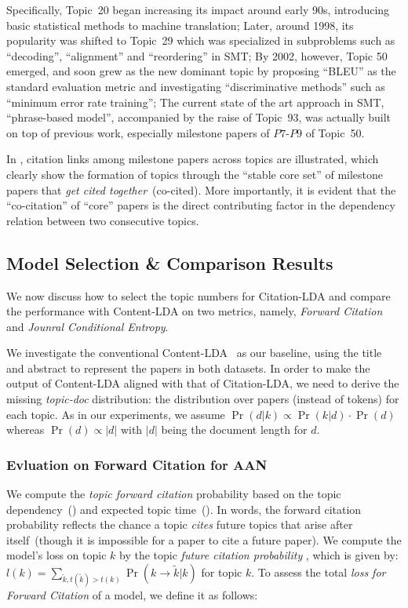 Specifically, Topic~20 began increasing its impact around early 90s, introducing
basic statistical methods to machine translation; Later, around 1998, its
popularity was shifted to Topic~29 which was specialized in subproblems such as
``decoding'', ``alignment'' and ``reordering'' in SMT; By 2002, however, Topic
50 emerged, and soon grew as the new dominant topic by proposing ``BLEU'' as the
standard evaluation metric and investigating ``discriminative methods'' such as
``minimum error rate training''; The current state of the art approach in SMT,
``phrase-based model'', accompanied by the raise of Topic~93, was actually built
on top of previous work, especially milestone papers of $P7$-$P9$ of Topic~50.

In , citation links among milestone papers across topics
are illustrated, which clearly show the formation of topics through the ``stable
core set'' of milestone papers that \emph{get cited together}~(co-cited). More
importantly, it is evident that the ``co-citation'' of ``core'' papers is the
direct contributing factor in the dependency relation between two consecutive
topics.

\subsection{Model Selection \& Comparison Results}
\label{sec::citation_sec_model_selection}

We now discuss how to select the topic numbers for Citation-LDA and compare the
performance with Content-LDA on two metrics, namely, \emph{Forward Citation} and
\emph{Jounral Conditional Entropy}.

We investigate the conventional Content-LDA~\cite{blei2003latent} as our
baseline, using the title and abstract to represent the papers in both datasets.
In order to make the output of Content-LDA aligned with that of Citation-LDA, we
need to derive the missing \emph{topic-doc} distribution: the distribution over
papers (instead of tokens) for each topic.  As in our experiments, we assume
{$\Pr(d | k) \propto \Pr(k | d) \cdot \Pr(d)$} whereas {$\Pr(d)\propto |d|$}
with {\scriptsize $|d|$} being the document length for $d$.

\subsubsection{Evluation on Forward Citation for AAN}

We compute the \emph{topic forward citation} probability based on the topic
dependency~() and expected topic
time~().  In words, the forward citation probability
reflects the chance a topic \emph{cites} future topics that arise after
itself~(though it is impossible for a paper to cite a future paper).  We compute
the model's loss on topic $k$ by the topic \emph{future citation probability} ,
which is given by: {$l(k) = \sum\limits_{\tilde{k}, t(\tilde{k}) > t(k)} \Pr(k
\rightarrow \tilde{k} | k)$} for topic $k$. To assess the total \emph{loss for
Forward Citation} of a model, we define it as follows:


